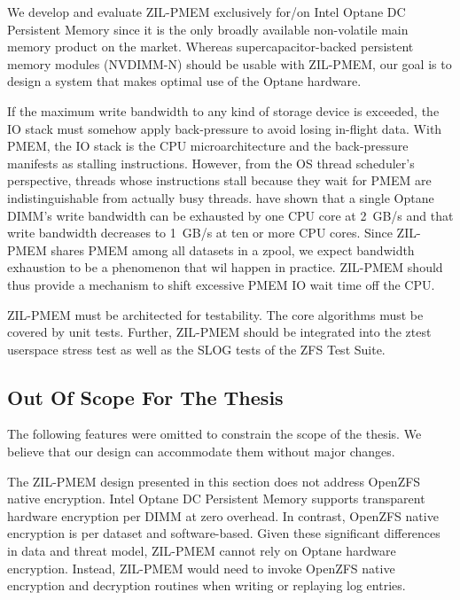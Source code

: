 \documentclass[12pt,a4paper,twoside]{book}
\begin{document}
We develop and evaluate ZIL-PMEM exclusively for/on Intel Optane DC Persistent Memory since it is the only broadly available non-volatile main memory product on the market.
Whereas supercapacitor-backed persistent memory modules (NVDIMM-N) should be usable with ZIL-PMEM, our goal is to design a system that makes optimal use of the Optane hardware.

If the maximum write bandwidth to any kind of storage device is exceeded, the IO stack must somehow apply back-pressure to avoid losing in-flight data.
With PMEM, the IO stack is the CPU microarchitecture and the back-pressure manifests as stalling instructions.
However, from the OS thread scheduler's perspective, threads whose instructions stall because they wait for PMEM are indistinguishable from actually busy threads.
\citeauthor{yangEmpiricalGuideBehavior2020} have shown that a single Optane DIMM's write bandwidth can be exhausted by one CPU core at 2~GB/s and that write bandwidth decreases to 1~GB/s at ten or more CPU cores.
Since ZIL-PMEM shares PMEM among all datasets in a zpool, we expect bandwidth exhaustion to be a phenomenon that wil happen in practice.
ZIL-PMEM should thus provide a mechanism to shift excessive PMEM IO wait time off the CPU.

ZIL-PMEM must be architected for testability.
The core algorithms must be covered by unit tests.
Further, ZIL-PMEM should be integrated into the ztest userspace stress test as well as the SLOG tests of the ZFS Test Suite.

\subsection{Out Of Scope For The Thesis}
The following features were omitted to constrain the scope of the thesis.
We believe that our design can accommodate them without major changes.

The ZIL-PMEM design presented in this section does not address OpenZFS native encryption.
Intel Optane DC Persistent Memory supports transparent hardware encryption per DIMM at zero overhead.
In contrast, OpenZFS native encryption is per dataset and software-based.
Given these significant differences in data and threat model, ZIL-PMEM cannot rely on Optane hardware encryption.
Instead, ZIL-PMEM would need to invoke OpenZFS native encryption and decryption routines when writing or replaying log entries.
\end{document}
